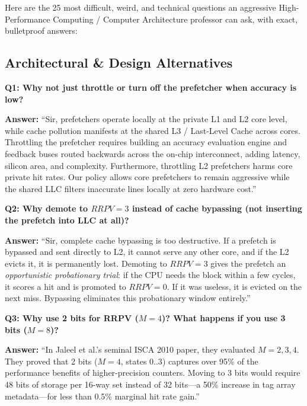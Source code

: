 \documentclass[11pt, a4paper]{article}
\begin{document}
Here are the 25 most difficult, weird, and technical questions an aggressive High-Performance Computing / Computer Architecture professor can ask, with exact, bulletproof answers:

\subsection{Architectural \& Design Alternatives}

\begin{trapbox}
\textbf{Q1: Why not just throttle or turn off the prefetcher when accuracy is low?}
\end{trapbox}
\begin{answerbox}
\textbf{Answer:} ``Sir, prefetchers operate locally at the private L1 and L2 core level, while cache pollution manifests at the shared L3 / Last-Level Cache across cores. Throttling the prefetcher requires building an accuracy evaluation engine and feedback buses routed backwards across the on-chip interconnect, adding latency, silicon area, and complexity. Furthermore, throttling L2 prefetchers harms core private hit rates. Our policy allows core prefetchers to remain aggressive while the shared LLC filters inaccurate lines locally at zero hardware cost.''
\end{answerbox}

\begin{trapbox}
\textbf{Q2: Why demote to $RRPV=3$ instead of cache bypassing (not inserting the prefetch into LLC at all)?}
\end{trapbox}
\begin{answerbox}
\textbf{Answer:} ``Sir, complete cache bypassing is too destructive. If a prefetch is bypassed and sent directly to L2, it cannot serve any other core, and if the L2 evicts it, it is permanently lost. Demoting to $RRPV=3$ gives the prefetch an \textit{opportunistic probationary trial}: if the CPU needs the block within a few cycles, it scores a hit and is promoted to $RRPV=0$. If it was useless, it is evicted on the next miss. Bypassing eliminates this probationary window entirely.''
\end{answerbox}

\begin{trapbox}
\textbf{Q3: Why use 2 bits for RRPV ($M=4$)? What happens if you use 3 bits ($M=8$)?}
\end{trapbox}
\begin{answerbox}
\textbf{Answer:} ``In Jaleel et al.'s seminal ISCA 2010 paper, they evaluated $M=2, 3, 4$. They proved that 2 bits ($M=4$, states $0..3$) captures over 95\% of the performance benefits of higher-precision counters. Moving to 3 bits would require 48 bits of storage per 16-way set instead of 32 bits---a 50\% increase in tag array metadata---for less than 0.5\% marginal hit rate gain.''
\end{answerbox}
\end{document}
